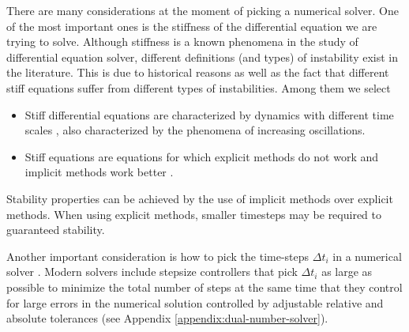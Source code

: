 There are many considerations at the moment of picking a numerical solver. 
One of the most important ones is the stiffness of the differential equation we are trying to solve. 
Although stiffness is a known phenomena in the study of differential equation solver, different definitions (and types) of instability exist in the literature. 
This is due to historical reasons \cite{Dahlquist_1985} as well as the fact that different stiff equations suffer from different types of instabilities. 
Among them we select
\begin{itemize}
    \item Stiff differential equations are characterized by dynamics with different time scales \cite{kim_stiff_2021}, also characterized by the phenomena of increasing oscillations\cite{Dahlquist_1985}.
    \item Stiff equations are equations for which explicit methods do not work and implicit methods work better \cite{hairer-solving-2}.
\end{itemize}
Stability properties can be achieved by the use of implicit methods over explicit methods. 
When using explicit methods, smaller timesteps may be required to guaranteed stability. 

Another important consideration is how to pick the time-steps $\Delta t_i$ in a numerical solver \cite{hairer-solving-1}. 
Modern solvers include stepsize controllers that pick $\Delta t_i$ as large as possible to minimize the total number of steps at the same time that they control for large errors in the numerical solution controlled by adjustable relative and absolute tolerances (see Appendix \ref{appendix:dual-number-solver}). 






